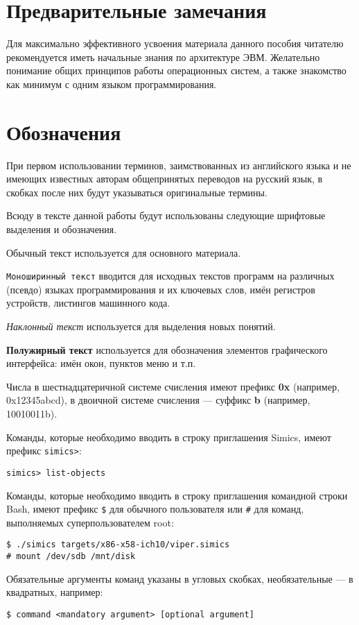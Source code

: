 \section{Предварительные замечания}

Для максимально эффективного усвоения материала данного пособия читателю рекомендуется иметь начальные знания по архитектуре ЭВМ. Желательно понимание общих принципов работы операционных систем, а также знакомство как  минимум с одним языком программирования.

\section{Обозначения}
При первом использовании терминов, заимствованных из английского языка и не имеющих известных авторам общепринятых переводов на русский язык, в скобках после них будут указываться оригинальные термины.

Всюду в тексте данной работы будут использованы следующие шрифтовые выделения и обозначения.

\begin{itemize*}
    \item Обычный текст используется для основного материала.
    \item \texttt{Моноширинный текст} вводится для исходных текстов программ на различных (псевдо) языках программирования и их ключевых слов,  имён регистров устройств, листингов машинного кода.
    \item \textit{Наклонный текст} используется для выделения новых понятий.
    \item \textbf{Полужирный текст} используется для обозначения элементов графического интерфейса: имён окон, пунктов меню и т.п.
    \item Числа в шестнадцатеричной системе счисления имеют префикс \textbf{0x} (например, 0x12345abcd), в двоичной системе счисления --- суффикс \textbf{b} (например, 10010011b).
    \item Команды, которые необходимо вводить в строку приглашения Simics, имеют префикс \texttt{simics>}:
    \begin{lstlisting}
simics> list-objects
    \end{lstlisting}
    \item Команды, которые необходимо вводить в строку приглашения командной строки Bash, имеют префикс \texttt{\$} для обычного пользователя или \texttt{\#} для команд, выполняемых суперпользователем root:
    \begin{lstlisting}
$ ./simics targets/x86-x58-ich10/viper.simics
# mount /dev/sdb /mnt/disk
    \end{lstlisting}

    \item Обязательные аргументы команд указаны в угловых скобках, необязательные --- в квадратных, например:
    \begin{lstlisting}
$ command <mandatory argument> [optional argument]
    \end{lstlisting}

\end{itemize*}

